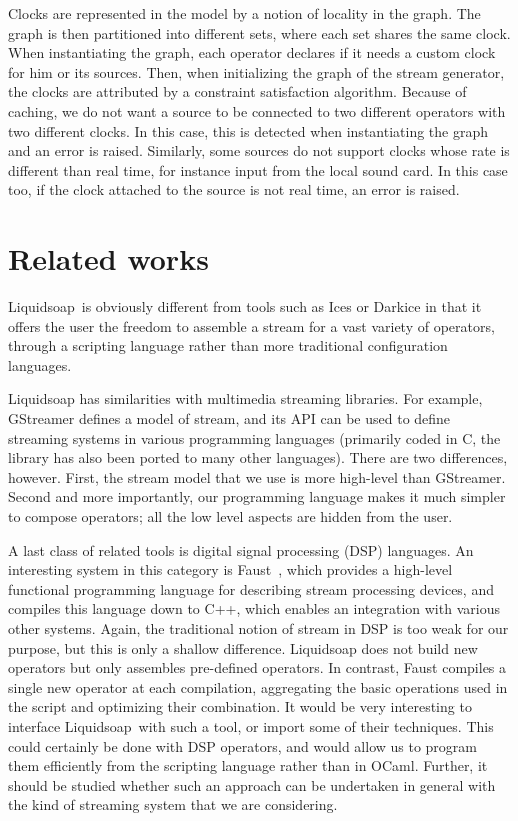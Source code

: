 \documentclass{llncs}
\newcommand{\liquidsoap}{Liquidsoap}
\begin{document}
Clocks are represented in the model by a notion of locality in the graph. The graph is then partitioned into 
different sets, where each set shares the same clock.
When instantiating the graph, each operator declares if it needs a custom clock for him or its sources. 
Then, when initializing the graph of the stream generator, the clocks are attributed by a constraint 
satisfaction algorithm. Because of caching, we do not want a source to be connected to two different operators with 
two different clocks. In this case, this is detected when instantiating the graph and an error is raised.
Similarly, some sources do not support clocks whose rate is different than real time, for instance input 
from the local sound card. In this case too, if the clock attached to the source is not real time, an error
is raised.

\section{Related works}

\liquidsoap\ is obviously different from tools such as Ices or Darkice in
that it offers the user the freedom to assemble a stream
for a vast variety of operators, through a scripting
language rather than more traditional configuration languages.

Liquidsoap has similarities with multimedia streaming libraries.
For example, GStreamer defines a model of stream, and its API
can be used to define streaming systems in various programming
languages (primarily coded in C, the library has also been
ported to many other languages).
There are two differences, however.
First, the stream model that we use is more high-level than
GStreamer. %
Second and more importantly,
our programming language makes it much simpler
to compose operators; all the low level aspects are hidden
from the user.

A last class of related tools is digital signal processing (DSP) languages.
An interesting system in this category is Faust~\cite{faust},
which provides a high-level functional programming language for
describing stream processing devices,
and compiles this language down to C++, which enables an integration
with various other systems.
Again, the traditional notion of stream in DSP is too weak for our
purpose, but this is only a shallow difference.
Liquidsoap does not build new operators but only assembles pre-defined
operators. In contrast, Faust compiles a single new operator at each
compilation, aggregating the basic operations used in the script
and optimizing their combination.
It would be very interesting to interface \liquidsoap\ with such a tool,
or import some of their techniques. This could certainly be done with
DSP operators, and would allow us to program them efficiently from
the scripting language rather than in OCaml. Further, it should
be studied whether such an approach can be undertaken in general with
the kind of streaming system that we are considering.
\end{document}

